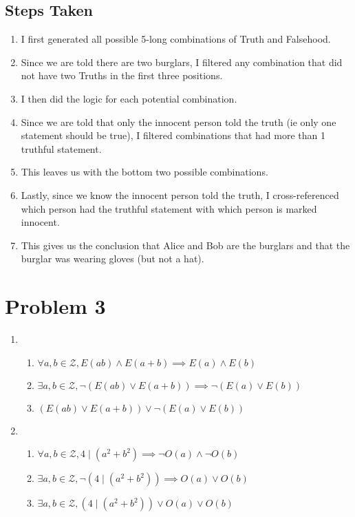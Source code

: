 \documentclass{article}
\begin{document}
\begin{landscape}
    \subsection*{Steps Taken}
    \begin{enumerate}[label=\arabic*.]
        \item I first generated all possible 5-long combinations of Truth and Falsehood.
        \item Since we are told there are two burglars, I filtered any combination that did not have two Truths in the first three positions.
        \item I then did the logic for each potential combination.
        \item Since we are told that only the innocent person told the truth (ie only one statement should be true), I filtered combinations that had more than 1 truthful statement.
        \item This leaves us with the bottom two possible combinations.
        \item Lastly, since we know the innocent person told the truth, I cross-referenced which person had the truthful statement with which person is marked innocent.
        \item This gives us the conclusion that Alice and Bob are the burglars and that the burglar was wearing gloves (but not a hat).
    \end{enumerate}
\end{landscape}

\pagebreak

\section*{Problem 3}
\begin{enumerate}[label=\arabic*)]
    \item \begin{enumerate}
              \item \(\forall a,b \in \mathcal{Z}, E(ab) \land E(a+b) \implies E(a) \land E(b)\)
              \item \(\exists a,b \in \mathcal{Z}, \neg (E(ab) \lor E(a+b)) \implies \neg (E(a) \lor E(b))\)
              \item \((E(ab) \lor E(a+b)) \lor \neg (E(a) \lor E(b))\)
          \end{enumerate}
    \item \begin{enumerate}
              \item \(\forall a,b \in \mathcal{Z}, 4 \mid (a^2 + b^2) \implies \neg O(a) \land \neg O(b)\)
              \item \(\exists a,b \in \mathcal{Z}, \neg(4 \mid (a^2 + b^2)) \implies O(a) \lor O(b)\)
              \item \(\exists a,b \in \mathcal{Z}, (4 \mid (a^2 + b^2)) \lor O(a) \lor O(b)\)
          \end{enumerate}
\end{enumerate}
\end{document}
